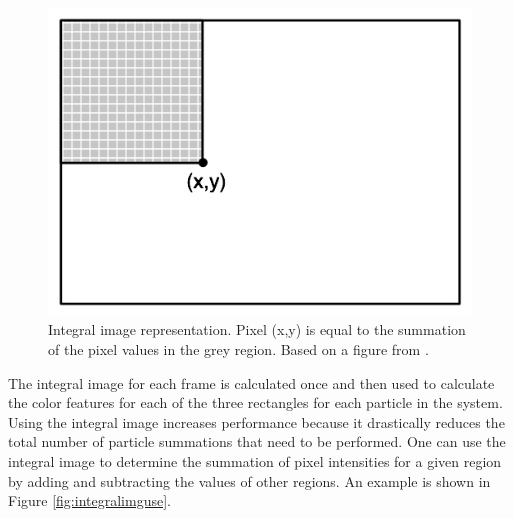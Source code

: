 \documentclass[11pt]{article}
\begin{document}
 \begin{figure}[H]
\centering
\includegraphics[scale=.4]{img/IntegralImage.jpg}
\caption{Integral image representation. Pixel (x,y) is equal to the summation of the pixel values in the grey region. Based on a figure from \cite{facedetection}.}
\label{fig:integralimg}
\end{figure}

The integral image for each frame is calculated once and then used to calculate the color features for each of the three rectangles for each particle in the system. Using the integral image increases performance because it drastically reduces the total number of particle summations that need to be performed. One can use the integral image to determine the summation of pixel intensities for a given region by adding and subtracting the values of other regions. An example is shown in Figure \ref{fig:integralimguse}.
\end{document}
